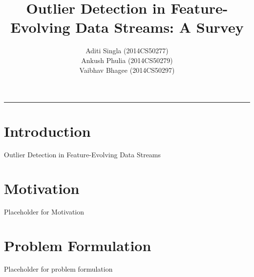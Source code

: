 \documentclass{article}
\title{\textbf{Outlier Detection in Feature-Evolving Data Streams: A Survey}}
\author{Aditi Singla (2014CS50277) \\ Ankush Phulia (2014CS50279) \\ Vaibhav Bhagee (2014CS50297)}
\date{}
\begin{document}
\maketitle

\begin{center}
\noindent\rule{3.2cm}{0.4pt} 
\end{center}

    \newpage

    \section{Introduction}

    Outlier Detection in Feature-Evolving Data Streams\cite{Manzoor:2018:XOD:3219819.3220107}

    \section{Motivation}

    Placeholder for Motivation

    \section{Problem Formulation}

    Placeholder for problem formulation



\end{document}
